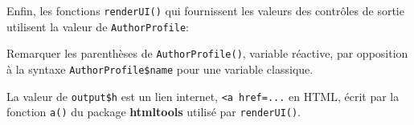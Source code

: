 \documentclass[
  12pt,
  french,
  a4paper,
  extrafontsizes,onecolumn,openright
  ]{memoir}
\newenvironment{Shaded}{\begin{snugshade}}{\end{snugshade}}
\newcommand{\AttributeTok}[1]{\textcolor[rgb]{0.13,0.29,0.53}{#1}}
\newcommand{\CommentTok}[1]{\textcolor[rgb]{0.56,0.35,0.01}{\textit{#1}}}
\newcommand{\FunctionTok}[1]{\textcolor[rgb]{0.13,0.29,0.53}{\textbf{#1}}}
\newcommand{\NormalTok}[1]{#1}
\newcommand{\OtherTok}[1]{\textcolor[rgb]{0.56,0.35,0.01}{#1}}
\newcommand{\SpecialCharTok}[1]{\textcolor[rgb]{0.81,0.36,0.00}{\textbf{#1}}}
\newcommand{\StringTok}[1]{\textcolor[rgb]{0.31,0.60,0.02}{#1}}
\begin{document}
\scriptsize

\begin{Shaded}
\end{Shaded}

\normalsize

Enfin, les fonctions \texttt{renderUI()} qui fournissent les valeurs des contrôles de sortie utilisent la valeur de \texttt{AuthorProfile}:

\scriptsize

\begin{Shaded}
\end{Shaded}

\normalsize

Remarquer les parenthèses de \texttt{AuthorProfile()}, variable réactive, par opposition à la syntaxe \texttt{AuthorProfile\$name} pour une variable classique.

La valeur de \texttt{output\$h} est un lien internet, \texttt{\textless{}a\ href=...} en HTML, écrit par la fonction \texttt{a()} du package \textbf{htmltools} utilisé par \texttt{renderUI()}.

\scriptsize

\begin{Shaded}
\end{Shaded}
\end{document}
